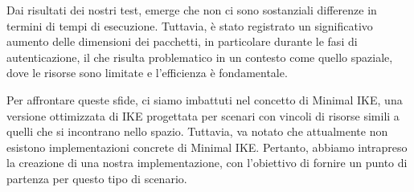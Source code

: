 Dai risultati dei nostri test, emerge che non ci sono sostanziali differenze in
termini di tempi di esecuzione. Tuttavia, è stato registrato un significativo
aumento delle dimensioni dei pacchetti, in particolare durante le fasi di
autenticazione, il che risulta problematico in un contesto come quello spaziale,
dove le risorse sono limitate e l'efficienza è fondamentale.

Per affrontare queste sfide, ci siamo imbattuti nel concetto di Minimal IKE,
una versione ottimizzata di IKE progettata per scenari con vincoli di risorse
simili a quelli che si incontrano nello spazio. Tuttavia, va notato che
attualmente non esistono implementazioni concrete di Minimal IKE\@. Pertanto,
abbiamo intrapreso la creazione di una nostra implementazione, con l'obiettivo
di fornire un punto di partenza per questo tipo di scenario.



